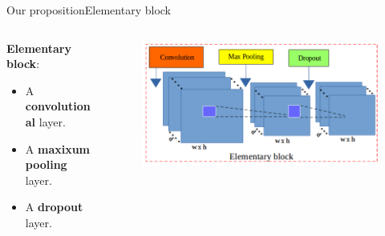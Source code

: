 \documentclass[10pt,svgnames]{beamer}
\begin{document}
\begin{frame}{Our proposition}{Elementary block}
  \begin{columns}
		\begin{column}{0.45\textwidth}	
			
			\textbf{\color{elem}Elementary block}: 
			\small{
			\begin{itemize}
				\item A \textbf{\color{conv}convolutional} layer.
    			\item A \textbf{\color{pool}maxixum pooling} layer.
    			\item A \textbf{\color{drop}dropout} layer.
  			\end{itemize}  			
  			}			 			
		\end{column}
		\begin{column}{0.55\textwidth}  %
			\begin{center}
     			\begin{figure}[htbp]
        			\centering
        			\includegraphics[scale=.28]{images/elementary_block}
    				\label{figrsexample1}
				\end{figure}
     		\end{center}	     					     		
		\end{column}
	\end{columns}~\\		
		
\end{frame}
\end{document}
